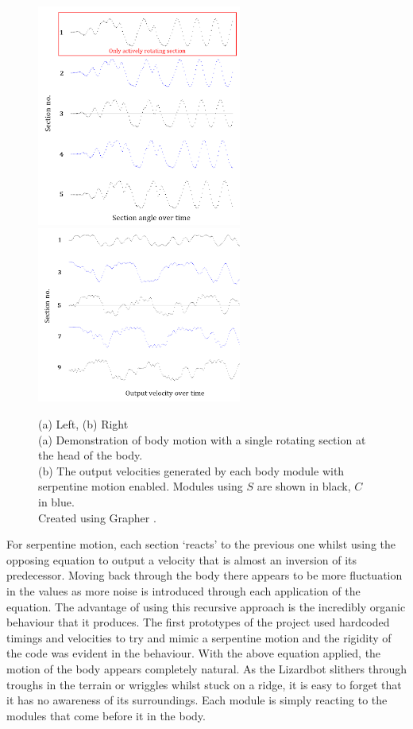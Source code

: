 \documentclass{article}
\begin{document}
\begin{figure}[H]
\centering
\centerline{
\includegraphics[width=0.6\textwidth]{cpgMirroring}
\includegraphics[width=0.6\textwidth]{cpgSerpentine}
}
\caption{(a) Left, (b) Right\\
(a) Demonstration of body motion with a single rotating section at the head of the body.\\
(b) The output velocities generated by each body module with serpentine motion enabled. Modules using $S$ are shown in black, $C$ in blue.\\
Created using Grapher \citep{grapher}.}
\label{fig:bodyOutput}
\end{figure}

For serpentine motion, each section ‘reacts’ to the previous one whilst using the opposing equation to output a velocity that is almost an inversion of its predecessor. Moving back through the body there appears to be more fluctuation in the values as more noise is introduced through each application of the equation. The advantage of using this recursive approach is the incredibly organic behaviour that it produces. The first prototypes of the project used hardcoded timings and velocities to try and mimic a serpentine motion and the rigidity of the code was evident in the behaviour. With the above equation applied, the motion of the body appears completely natural. As the Lizardbot slithers through troughs in the terrain or wriggles whilst stuck on a ridge, it is easy to forget that it has no awareness of its surroundings. Each module is simply reacting to the  modules that come before it in the body.
\end{document}
